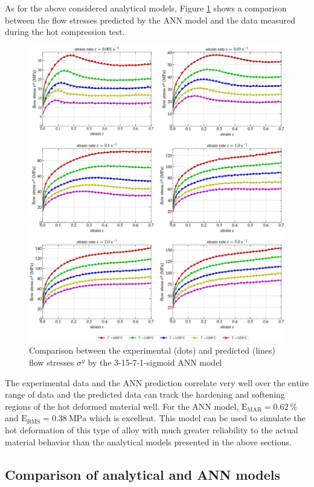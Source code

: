 \documentclass[metals,article,submit,pdftex,moreauthors]{Definitions/mdpi}
\DeclareRobustCommand{\RMSE}{\text{E}_\text{RMS}}
\DeclareRobustCommand{\MARE}{\text{E}_\text{MAR}}
\DeclareRobustCommand{\MPa}{\text{MPa}}
\begin{document}
As for the above considered analytical models, Figure \ref{fig:CompExp-3-15-7-1-sigmoid} shows a comparison between the flow stresses predicted by the ANN model and the data measured during the hot compression test.
\begin{figure}[!ht]
\centering
\includegraphics[width=\columnwidth]
{Figures/CompExp-3-15-7-1-sigmoid}
\caption{Comparison between the experimental (dots) and predicted (lines) flow stresses $\sigma^y$ by the 3-15-7-1-sigmoid ANN model}
\label{fig:CompExp-3-15-7-1-sigmoid}
\end{figure}
The experimental data and the ANN prediction correlate very well over the entire range of data and the predicted data can track the hardening and softening regions of the hot deformed material well.
For the ANN model, $\MARE=0.62~\%$ and $\RMSE=0.38~\MPa$ which is excellent.
This model can be used to simulate the hot deformation of this type of alloy with much greater reliability to the actual material behavior than the analytical models presented in the above sections.

\subsection{Comparison of analytical and ANN models\label{sec:Comparison}}
\end{document}
